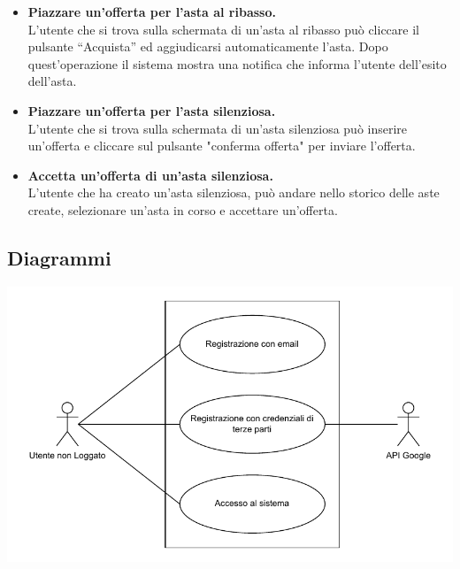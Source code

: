 \begin{itemize}
	\item \textbf{Piazzare un'offerta per l'asta al ribasso.}\\
	      L'utente che si trova sulla schermata di un'asta al ribasso può cliccare il pulsante “Acquista” ed aggiudicarsi automaticamente l'asta. Dopo quest'operazione il sistema mostra una notifica che informa l'utente dell'esito dell'asta.

	\item \textbf{Piazzare un'offerta per l'asta silenziosa.}\\
	      L'utente che si trova sulla schermata di un'asta silenziosa può inserire un'offerta e cliccare sul pulsante "conferma offerta" per inviare l'offerta.

	\item \textbf{Accetta un'offerta di un'asta silenziosa.}\\
	      L'utente che ha creato un'asta silenziosa, può andare nello storico delle aste create, selezionare un'asta in corso e accettare un'offerta.

\end{itemize}

\newpage
\subsection{Diagrammi}
\includegraphics[width=.7\textwidth]{images/utente_non_loggato_use_case_diagram.pdf}

